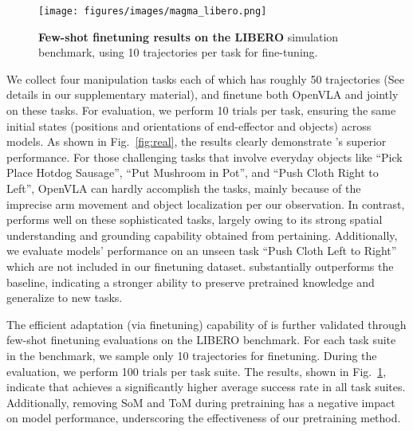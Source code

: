 \begin{figure}[!t]
    \centering
    \texttt{[image: figures/images/magma\_libero.png]}
    \vspace{-5pt}
    \caption{\textbf{Few-shot finetuning results on the LIBERO} simulation benchmark, using 10 trajectories per task for fine-tuning.}
    \label{fig:libero}
\vspace{-10pt}
\end{figure}




We collect four manipulation tasks each of which has roughly 50 trajectories (See details in our supplementary material), and finetune both OpenVLA and \magma jointly on these tasks. For evaluation, we perform 10 trials per task, ensuring the same initial states (positions and orientations of end-effector and objects) across models. As shown in Fig.~\ref{fig:real}, the results clearly demonstrate \magma's superior performance. For those challenging tasks that involve everyday objects like ``Pick Place Hotdog Sausage'', ``Put Mushroom in Pot'', and ``Push Cloth Right to Left'', OpenVLA can hardly accomplish the tasks, mainly because of the imprecise arm movement and object localization per our observation. In contrast, \magma performs well on these sophisticated tasks, largely owing to its strong spatial understanding and grounding capability obtained from pertaining. Additionally, we evaluate models' performance on an unseen task ``Push Cloth Left to Right'' which are not included in our finetuning dataset. \magma substantially outperforms the baseline, indicating a stronger ability to preserve pretrained knowledge and generalize to new tasks.

The efficient adaptation (via finetuning) capability of \magma is further validated through few-shot finetuning evaluations on the LIBERO benchmark. For each task suite in the benchmark, we sample only 10 trajectories for finetuning. During the evaluation, we perform 100 trials per task suite. The results, shown in Fig.~\ref{fig:libero}, indicate that \magma achieves a significantly higher average success rate in all task suites. 
Additionally, removing SoM and ToM during pretraining has a negative impact on model performance, underscoring the effectiveness of our pretraining method.

